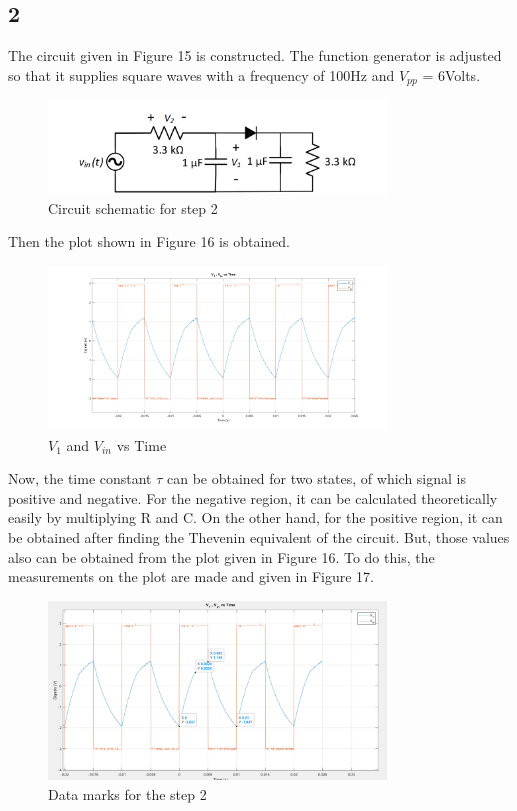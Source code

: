 \documentclass[letterpaper,12pt]{article}
\begin{document}
\subsection{2}
The circuit given in Figure 15 is constructed. The function generator is adjusted so that it supplies square waves with a frequency of 100Hz and \(V_{pp}\) = 6Volts. 
\begin{figure}[H]
	\centering
   \includegraphics[width=0.8\textwidth]{2_sch.png}
   \caption{Circuit schematic for step 2}
\end{figure} 
Then the plot shown in Figure 16 is obtained.
\begin{figure}[H]
	\centering
   \includegraphics[width=0.8\textwidth]{2.png}
   \caption{\(V_1\) and \(V_{in}\) vs Time}
\end{figure} 
Now, the time constant \(\tau\) can be obtained for two states, of which signal is positive and negative. For the negative region, it can be calculated theoretically easily by multiplying R and C. On the other hand, for the positive region, it can be obtained after finding the Thevenin equivalent of the circuit. But, those values also can be obtained from the plot given in Figure 16. To do this, the measurements on the plot are made and given in Figure 17.
\begin{figure}[H]
	\centering
   \includegraphics[width=0.8\textwidth]{2_plot_data.png}
   \caption{Data marks for the step 2}
\end{figure} 
\end{document}
